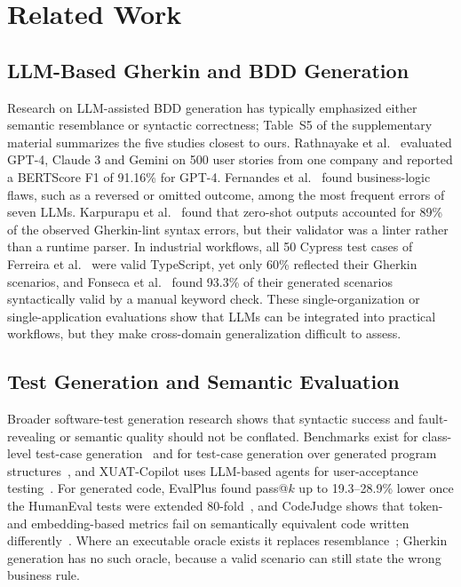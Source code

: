 \section{Related Work}
\label{sec:related}

\subsection{LLM-Based Gherkin and BDD Generation}

Research on LLM-assisted BDD generation has typically emphasized either semantic resemblance or syntactic correctness; Table~S5 of the supplementary material summarizes the five studies closest to ours. Rathnayake et al.~\cite{rathnayake2026} evaluated GPT-4, Claude 3 and Gemini on 500 user stories from one company and reported a BERTScore F1 of 91.16\% for GPT-4. Fernandes et al.~\cite{fernandes2025} found business-logic flaws, such as a reversed or omitted outcome, among the most frequent errors of seven LLMs. Karpurapu et al.~\cite{karpurapu2024} found that zero-shot outputs accounted for 89\% of the observed Gherkin-lint syntax errors, but their validator was a linter rather than a runtime parser. In industrial workflows, all 50 Cypress test cases of Ferreira et al.~\cite{ferreira2025} were valid TypeScript, yet only 60\% reflected their Gherkin scenarios, and Fonseca et al.~\cite{fonseca2025} found 93.3\% of their generated scenarios syntactically valid by a manual keyword check. These single-organization or single-application evaluations show that LLMs can be integrated into practical workflows, but they make cross-domain generalization difficult to assess.

\subsection{Test Generation and Semantic Evaluation}

Broader software-test generation research shows that syntactic success and fault-revealing or semantic quality should not be conflated. Benchmarks exist for class-level test-case generation~\cite{zhang2025testbench} and for test-case generation over generated program structures~\cite{chang2025}, and XUAT-Copilot uses LLM-based agents for user-acceptance testing~\cite{wang2024xuat}. For generated code, EvalPlus found pass@$k$ up to 19.3--28.9\% lower once the HumanEval tests were extended 80-fold~\cite{liu2023evalplus}, and CodeJudge shows that token- and embedding-based metrics fail on semantically equivalent code written differently~\cite{tong2024codejudge}. Where an executable oracle exists it replaces resemblance~\cite{kang2023libro,fakhoury2024ticoder,foster2025ach}; Gherkin generation has no such oracle, because a valid scenario can still state the wrong business rule.

